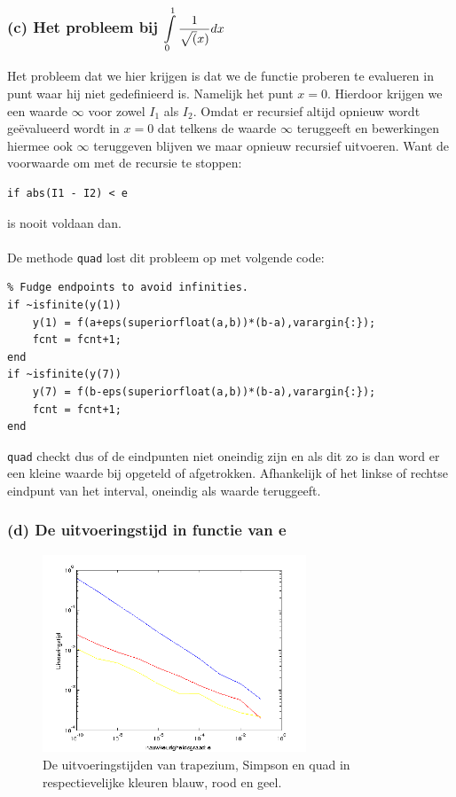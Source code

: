 \documentclass[11pt,a4paper]{article}
\begin{document}
\subsubsection*{(c) Het probleem bij $\mathop{\mathlarger{\int\limits_{0}^1\frac{1}{\sqrt(x)}dx}}$}
Het probleem dat we hier krijgen is dat we de functie proberen te evalueren in punt waar hij niet gedefinieerd is. Namelijk het punt $x=0$. Hierdoor krijgen we een waarde $\infty$ voor zowel $I_1$ als $I_2$. Omdat er recursief altijd opnieuw wordt ge\"evalueerd wordt in $x=0$ dat telkens de waarde $\infty$ teruggeeft en bewerkingen hiermee ook $\infty$ teruggeven blijven we maar opnieuw recursief uitvoeren. Want de voorwaarde om met de recursie te stoppen: 
\begin{verbatim}
if abs(I1 - I2) < e
\end{verbatim}
is nooit voldaan dan.
\\
\\
De methode \verb|quad| lost dit probleem op met volgende code:
\begin{verbatim}
% Fudge endpoints to avoid infinities.
if ~isfinite(y(1))
    y(1) = f(a+eps(superiorfloat(a,b))*(b-a),varargin{:});
    fcnt = fcnt+1;
end
if ~isfinite(y(7))
    y(7) = f(b-eps(superiorfloat(a,b))*(b-a),varargin{:});
    fcnt = fcnt+1;
end
\end{verbatim}
\verb|quad| checkt dus of de eindpunten niet oneindig zijn en als dit zo is dan word er een kleine waarde bij opgeteld of afgetrokken. Afhankelijk of het linkse of rechtse eindpunt van het interval, oneindig als waarde teruggeeft.
\subsubsection*{(d) De uitvoeringstijd in functie van e }

\begin{figure}[H]
	\vspace{-20pt}
	\centering
	\includegraphics[width=0.7\textwidth]{12d1.png}
	\caption*{De uitvoeringstijden van trapezium, Simpson en quad in respectievelijke kleuren blauw, rood en geel.}
	\end{figure}
\end{document}
